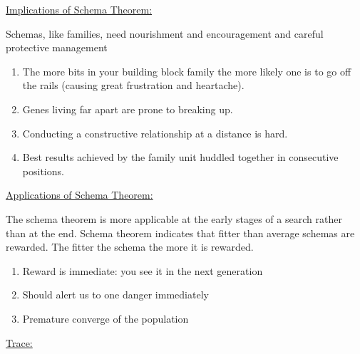 \documentclass[12pt]{article}
\renewcommand{\_}{\kern-1.5pt\textunderscore\kern-1.5pt}
\begin{document}
\vspace{\baselineskip}
\setlength{\parskip}{8.04pt}
{\fontsize{14pt}{16.8pt}\selectfont \uline{Implications of Schema Theorem:}\par}\par

Schemas, like families, need nourishment and encouragement and careful protective management\par

\begin{enumerate}
	\item The more bits in your building block family the more likely one is to go off the rails (causing great frustration and heartache).\par

	\item Genes living far apart are prone to breaking up.\par

	\item Conducting a constructive relationship at a distance is hard.\par

	\item Best results achieved by the family unit huddled together in consecutive positions.
\end{enumerate}\par

{\fontsize{14pt}{16.8pt}\selectfont \uline{Applications of Schema Theorem:}\par}\par

The schema theorem is more applicable at the early stages of a search rather than at the end. Schema theorem indicates that fitter than average schemas are rewarded. The fitter the schema the more it is rewarded.\par

\begin{enumerate}
	\item Reward is immediate: you see it in the next generation\par

	\item Should alert us to one danger immediately\par

	\item Premature converge of the population
\end{enumerate}\par

{\fontsize{14pt}{16.8pt}\selectfont \uline{Trace:}\par}\par
\end{document}
